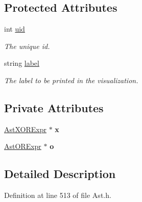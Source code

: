 \subsection*{Protected Attributes}
\begin{DoxyCompactItemize}
\item 
\hypertarget{classAST_a847b778f1c3dd5a19de32de432ee6e15}{int \hyperlink{classAST_a847b778f1c3dd5a19de32de432ee6e15}{uid}}\label{classAST_a847b778f1c3dd5a19de32de432ee6e15}

\begin{DoxyCompactList}\small\item\em The unique id. \end{DoxyCompactList}\item 
\hypertarget{classAST_ab2e239ccc0688d2341724432ff5a1a31}{string \hyperlink{classAST_ab2e239ccc0688d2341724432ff5a1a31}{label}}\label{classAST_ab2e239ccc0688d2341724432ff5a1a31}

\begin{DoxyCompactList}\small\item\em The label to be printed in the visualization. \end{DoxyCompactList}\end{DoxyCompactItemize}
\subsection*{Private Attributes}
\begin{DoxyCompactItemize}
\item 
\hypertarget{classAstORExpr_ab1413cbbbbdbd4e85e76e42bd6f2da08}{\hyperlink{classAstXORExpr}{Ast\-X\-O\-R\-Expr} $\ast$ {\bfseries x}}\label{classAstORExpr_ab1413cbbbbdbd4e85e76e42bd6f2da08}

\item 
\hypertarget{classAstORExpr_abad726910fff04f21516a1abffbf58b0}{\hyperlink{classAstORExpr}{Ast\-O\-R\-Expr} $\ast$ {\bfseries o}}\label{classAstORExpr_abad726910fff04f21516a1abffbf58b0}

\end{DoxyCompactItemize}


\subsection{Detailed Description}


Definition at line 513 of file Ast.\-h.



